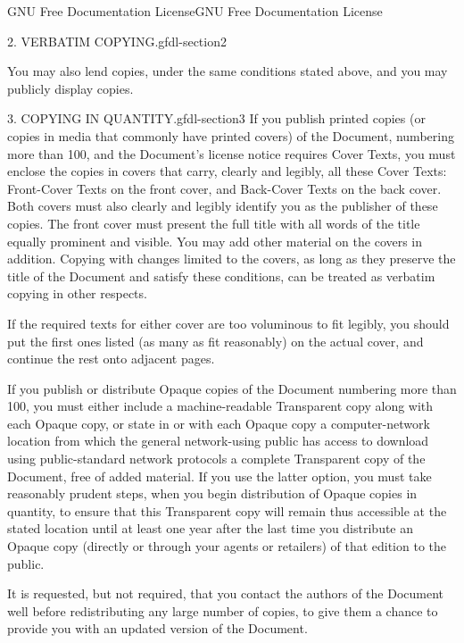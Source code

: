 \documentclass[10pt,]{book}
\numberwithin{equation}{section}
\begin{document}
\begin{appendixptx}{GNU Free Documentation License}{}{GNU Free Documentation License}{}{}
\begin{paragraphs}{2. VERBATIM COPYING.}{gfdl-section2}
\par
\hypertarget{p-1324}{}%
You may also lend copies, under the same conditions stated above, and you may publicly display copies.%
\end{paragraphs}%
\begin{paragraphs}{3. COPYING IN QUANTITY.}{gfdl-section3}%
\hypertarget{p-1325}{}%
If you publish printed copies (or copies in media that commonly have printed covers) of the Document, numbering more than 100, and the Document's license notice requires Cover Texts, you must enclose the copies in covers that carry, clearly and legibly, all these Cover Texts: Front-Cover Texts on the front cover, and Back-Cover Texts on the back cover. Both covers must also clearly and legibly identify you as the publisher of these copies. The front cover must present the full title with all words of the title equally prominent and visible. You may add other material on the covers in addition. Copying with changes limited to the covers, as long as they preserve the title of the Document and satisfy these conditions, can be treated as verbatim copying in other respects.%
\par
\hypertarget{p-1326}{}%
If the required texts for either cover are too voluminous to fit legibly, you should put the first ones listed (as many as fit reasonably) on the actual cover, and continue the rest onto adjacent pages.%
\par
\hypertarget{p-1327}{}%
If you publish or distribute Opaque copies of the Document numbering more than 100, you must either include a machine-readable Transparent copy along with each Opaque copy, or state in or with each Opaque copy a computer-network location from which the general network-using public has access to download using public-standard network protocols a complete Transparent copy of the Document, free of added material. If you use the latter option, you must take reasonably prudent steps, when you begin distribution of Opaque copies in quantity, to ensure that this Transparent copy will remain thus accessible at the stated location until at least one year after the last time you distribute an Opaque copy (directly or through your agents or retailers) of that edition to the public.%
\par
\hypertarget{p-1328}{}%
It is requested, but not required, that you contact the authors of the Document well before redistributing any large number of copies, to give them a chance to provide you with an updated version of the Document.%
\end{paragraphs}%

\end{appendixptx}
\end{document}
